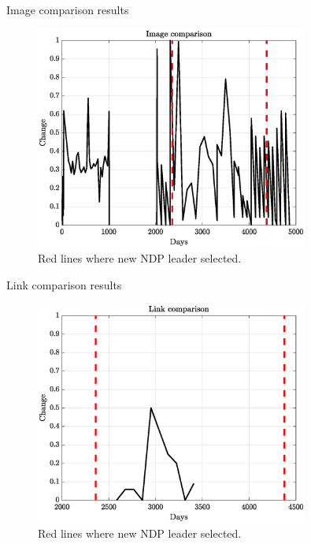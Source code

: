 \documentclass[10pt]{beamer}
\begin{document}
\begin{frame}{Image comparison results}
  \begin{figure}
    \centering
    \includegraphics[width = 0.8\textwidth]{image_comparison}
    \caption{Red lines where new NDP leader selected.}
  \end{figure}
\end{frame}

\begin{frame}{Link comparison results}
  \begin{figure}
    \centering
    \includegraphics[width = 0.8\textwidth]{link_comparison}
    \caption{Red lines where new NDP leader selected.}
  \end{figure}
\end{frame}
\end{document}
